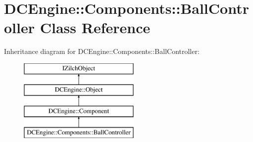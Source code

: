 \hypertarget{classDCEngine_1_1Components_1_1BallController}{\section{D\-C\-Engine\-:\-:Components\-:\-:Ball\-Controller Class Reference}
\label{classDCEngine_1_1Components_1_1BallController}
}
Inheritance diagram for D\-C\-Engine\-:\-:Components\-:\-:Ball\-Controller\-:\begin{figure}[H]
\begin{center}
\leavevmode
\includegraphics[height=4.000000cm]{classDCEngine_1_1Components_1_1BallController}
\end{center}
\end{figure}
